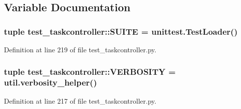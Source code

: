 \subsection{\-Variable \-Documentation}
\hypertarget{namespacetest__taskcontroller_a645b893cfab7774471762f6d86ff22e6}{
\subsubsection[{\-S\-U\-I\-T\-E}]{\setlength{\rightskip}{0pt plus 5cm}tuple {\bf test\-\_\-taskcontroller\-::\-S\-U\-I\-T\-E} = unittest.\-Test\-Loader()}}
\label{namespacetest__taskcontroller_a645b893cfab7774471762f6d86ff22e6}


\-Definition at line 219 of file test\-\_\-taskcontroller.\-py.

\hypertarget{namespacetest__taskcontroller_ab27699669a3b6b329f7a9168986ed220}{
\subsubsection[{\-V\-E\-R\-B\-O\-S\-I\-T\-Y}]{\setlength{\rightskip}{0pt plus 5cm}tuple {\bf test\-\_\-taskcontroller\-::\-V\-E\-R\-B\-O\-S\-I\-T\-Y} = util.\-verbosity\-\_\-helper()}}
\label{namespacetest__taskcontroller_ab27699669a3b6b329f7a9168986ed220}


\-Definition at line 217 of file test\-\_\-taskcontroller.\-py.

